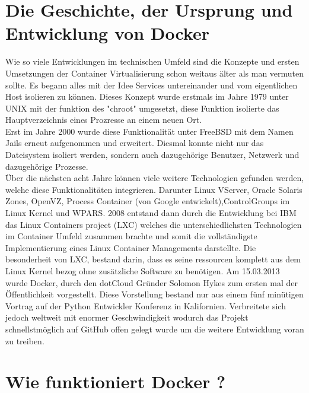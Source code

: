 \documentclass[12pt,toc=bib,toc=listof]{scrreprt}
\begin{document}
\section{Die Geschichte, der Ursprung und Entwicklung von Docker}
Wie so viele Entwicklungen im technischen Umfeld sind die Konzepte und ersten Umsetzungen der Container Virtualisierung schon weitaus älter als man vermuten sollte.
Es begann alles mit der Idee Services untereinander und vom eigentlichen Host isolieren zu können.
Dieses Konzept wurde erstmals im Jahre 1979 unter UNIX mit der funktion des "chroot" umgesetzt, diese Funktion isolierte das Hauptverzeichnis eines Prozresse an einem neuen Ort.\\
Erst im Jahre 2000 wurde diese Funktionalität unter FreeBSD mit dem Namen Jails erneut aufgenommen und erweitert.
Diesmal konnte nicht nur das Dateisystem isoliert werden, sondern auch dazugehörige Benutzer, Netzwerk und dazugehörige Prozesse.\\
Über die nächsten acht Jahre können viele weitere Technologien gefunden werden, welche diese Funktionalitäten integrieren. Darunter 
Linux VServer, Oracle Solaris Zones, OpenVZ, Process Container (von Google entwickelt),ControlGroups im Linux Kernel und WPARS.
2008 entstand dann durch die Entwicklung bei IBM  das Linux Containers project (LXC) welches die unterschiedlichsten Technologien im Container Umfeld zusammen brachte und somit die vollständigste Implementierung eines Linux Container Managements darstellte.
Die besonderheit von LXC, bestand darin, dass es seine ressourcen komplett aus dem Linux Kernel bezog ohne zusätzliche Software zu benötigen.
Am 15.03.2013 wurde Docker, durch den dotCloud Gründer Solomon Hykes zum ersten mal der Öffentlichkeit vorgestellt.
Diese Vorstellung bestand nur aus einem fünf minütigen Vortrag auf der Python Entwickler Konferenz in Kalifornien.
Verbreitete sich jedoch weltweit mit enormer Geschwindigkeit wodurch das Projekt schnellstmöglich auf GitHub offen gelegt wurde um die weitere Entwicklung voran zu treiben.

\section{Wie funktioniert Docker ?}
\end{document}

